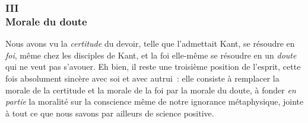 \documentclass[french,twoside]{book} %
\begin{document}
\subsubsection[{III. Morale du doute}]{III \\
Morale du doute}
\noindent Nous avons vu la \emph{certitude} du devoir, telle que l’admettait Kant, se résoudre en \emph{foi}, même chez les disciples de Kant, et la foi elle-même se résoudre en un \emph{doute} qui ne veut pas s’avouer. Eh bien, il reste une troisième position de l’esprit, cette fois absolument sincère avec soi et avec autrui : elle consiste à remplacer la morale de la certitude et la morale de la foi par la morale du doute, à fonder \emph{en partie} la moralité sur la conscience même de notre ignorance métaphysique, jointe à tout ce que nous savons par ailleurs de science positive.\par
\end{document}
